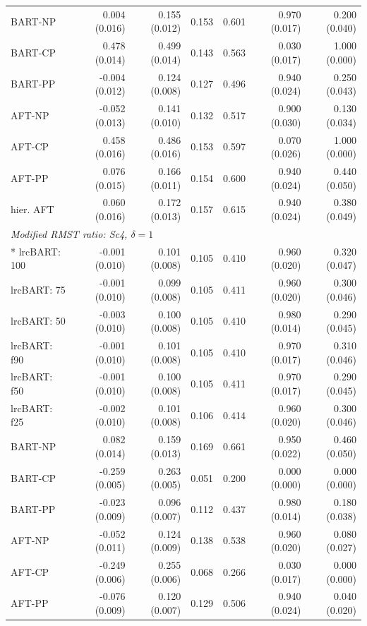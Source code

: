 \begin{landscape}
\begin{longtable}{lrrrrrr}
BART-NP & 0.004 (0.016) & 0.155 (0.012) & 0.153 & 0.601 & 0.970 (0.017) & 0.200 (0.040) \\
BART-CP & 0.478 (0.014) & 0.499 (0.014) & 0.143 & 0.563 & 0.030 (0.017) & 1.000 (0.000) \\
BART-PP & -0.004 (0.012) & 0.124 (0.008) & 0.127 & 0.496 & 0.940 (0.024) & 0.250 (0.043) \\
AFT-NP & -0.052 (0.013) & 0.141 (0.010) & 0.132 & 0.517 & 0.900 (0.030) & 0.130 (0.034) \\
AFT-CP & 0.458 (0.016) & 0.486 (0.016) & 0.153 & 0.597 & 0.070 (0.026) & 1.000 (0.000) \\
AFT-PP & 0.076 (0.015) & 0.166 (0.011) & 0.154 & 0.600 & 0.940 (0.024) & 0.440 (0.050) \\
hier. AFT & 0.060 (0.016) & 0.172 (0.013) & 0.157 & 0.615 & 0.940 (0.024) & 0.380 (0.049) \\
\multicolumn{7}{l}{\strut\textit{Modified RMST ratio: Sc4, $\delta=1$}}\\*
lrcBART: 100 & -0.001 (0.010) & 0.101 (0.008) & 0.105 & 0.410 & 0.960 (0.020) & 0.320 (0.047) \\
lrcBART: 75 & -0.001 (0.010) & 0.099 (0.008) & 0.105 & 0.411 & 0.960 (0.020) & 0.300 (0.046) \\
lrcBART: 50 & -0.003 (0.010) & 0.100 (0.008) & 0.105 & 0.410 & 0.980 (0.014) & 0.290 (0.045) \\
lrcBART: f90 & -0.001 (0.010) & 0.101 (0.008) & 0.105 & 0.410 & 0.970 (0.017) & 0.310 (0.046) \\
lrcBART: f50 & -0.001 (0.010) & 0.100 (0.008) & 0.105 & 0.411 & 0.970 (0.017) & 0.290 (0.045) \\
lrcBART: f25 & -0.002 (0.010) & 0.101 (0.008) & 0.106 & 0.414 & 0.960 (0.020) & 0.300 (0.046) \\
BART-NP & 0.082 (0.014) & 0.159 (0.013) & 0.169 & 0.661 & 0.950 (0.022) & 0.460 (0.050) \\
BART-CP & -0.259 (0.005) & 0.263 (0.005) & 0.051 & 0.200 & 0.000 (0.000) & 0.000 (0.000) \\
BART-PP & -0.023 (0.009) & 0.096 (0.007) & 0.112 & 0.437 & 0.980 (0.014) & 0.180 (0.038) \\
AFT-NP & -0.052 (0.011) & 0.124 (0.009) & 0.138 & 0.538 & 0.960 (0.020) & 0.080 (0.027) \\
AFT-CP & -0.249 (0.006) & 0.255 (0.006) & 0.068 & 0.266 & 0.030 (0.017) & 0.000 (0.000) \\
AFT-PP & -0.076 (0.009) & 0.120 (0.007) & 0.129 & 0.506 & 0.940 (0.024) & 0.040 (0.020) \\

\end{longtable}
\end{landscape}
